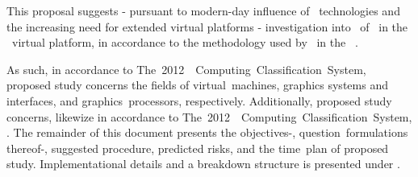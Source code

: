 \noindent
This proposal suggests - pursuant to  modern-day influence of \termgpu\ technologies and the increasing need for extended virtual platforms - investigation into \termparavirtualization\ of \termopengles\ in the \termsimics\ virtual platform, in accordance to the methodology used by \termgoogle\ in the \termandroid ~\termsdk .

As such, in accordance to The~2012~\termacm ~Computing~Classification~System, proposed study concerns the fields of virtual~machines, graphics systems and interfaces,  and graphics~processors, respectively. Additionally, proposed study concerns, likewize in accordance to The~2012~\termacm ~Computing~Classification~System, \termintel . The remainder of this document presents the objectives-, question~formulations thereof-, suggested procedure, predicted risks, and the time~plan of proposed study.
Implementational details and a breakdown structure is presented under .
